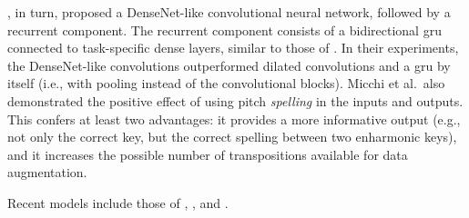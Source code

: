 \textcite{micchi2020not}, in turn, proposed a DenseNet-like
\parencite{huang2017densely} convolutional neural network,
followed by a recurrent component. The recurrent component
consists of a bidirectional \gls{gru}
\parencite{cho2014learning} connected to task-specific dense
layers, similar to those of \textcite{chen2018functional}.
In their experiments, the DenseNet-like convolutions
outperformed dilated convolutions and a \gls{gru} by itself
(i.e., with pooling instead of the convolutional blocks).
Micchi et al.~also demonstrated the positive effect of using
pitch \textit{spelling} in the inputs and outputs. This
confers at least two advantages: it provides a more
informative output (e.g., not only the correct key, but the
correct spelling between two enharmonic keys), and it
increases the possible number of transpositions available
for data augmentation.

Recent models include those of \textcite{micchi2021deep},
\textcite{mcleod2021modular}, and
\textcite{napoleslopez2021augmentednet}.
